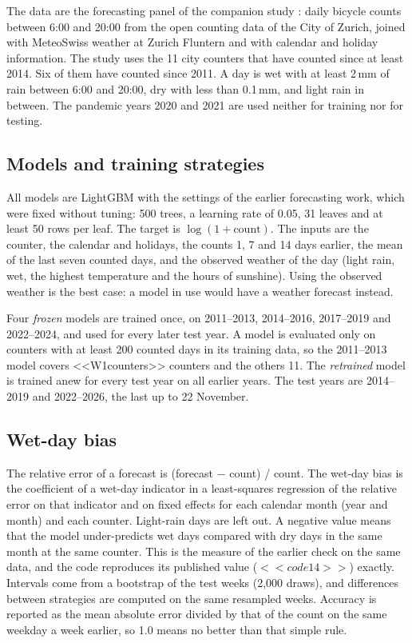 \documentclass[preprint,12pt,authoryear]{elsarticle}
\begin{document}
The data are the forecasting panel of the companion study \citep{arzimanli2026rain}: daily bicycle counts between 6:00 and 20:00 from the open counting data of the City of Zurich, joined with MeteoSwiss weather at Zurich Fluntern and with calendar and holiday information. The study uses the 11 city counters that have counted since at least 2014. Six of them have counted since 2011. A day is wet with at least 2\,mm of rain between 6:00 and 20:00, dry with less than 0.1\,mm, and light rain in between. The pandemic years 2020 and 2021 are used neither for training nor for testing.

\subsection{Models and training strategies}

All models are LightGBM \citep{ke2017lightgbm} with the settings of the earlier forecasting work, which were fixed without tuning: 500 trees, a learning rate of 0.05, 31 leaves and at least 50 rows per leaf. The target is $\log(1+\text{count})$. The inputs are the counter, the calendar and holidays, the counts 1, 7 and 14 days earlier, the mean of the last seven counted days, and the observed weather of the day (light rain, wet, the highest temperature and the hours of sunshine). Using the observed weather is the best case: a model in use would have a weather forecast instead.

Four \emph{frozen} models are trained once, on 2011--2013, 2014--2016, 2017--2019 and 2022--2024, and used for every later test year. A model is evaluated only on counters with at least 200 counted days in its training data, so the 2011--2013 model covers <<W1counters>> counters and the others 11. The \emph{retrained} model is trained anew for every test year on all earlier years. The test years are 2014--2019 and 2022--2026, the last up to 22 November.

\subsection{Wet-day bias}

The relative error of a forecast is (forecast $-$ count) / count. The wet-day bias is the coefficient of a wet-day indicator in a least-squares regression of the relative error on that indicator and on fixed effects for each calendar month (year and month) and each counter. Light-rain days are left out. A negative value means that the model under-predicts wet days compared with dry days in the same month at the same counter. This is the measure of the earlier check on the same data, and the code reproduces its published value ($<<code14>>$) exactly. Intervals come from a bootstrap of the test weeks (2,000 draws), and differences between strategies are computed on the same resampled weeks. Accuracy is reported as the mean absolute error divided by that of the count on the same weekday a week earlier, so 1.0 means no better than that simple rule.
\end{document}
